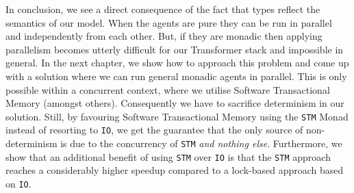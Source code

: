 In conclusion, we see a direct consequence of the fact that types reflect the semantics of our model. When the agents are pure they can be run in parallel and independently from each other. But, if they are monadic then applying parallelism becomes utterly difficult for our Transformer stack and impossible in general. In the next chapter, we show how to approach this problem and come up with a solution where we can run general monadic agents in parallel. This is only possible within a concurrent context, where we utilise Software Transactional Memory (amongst others). Consequently we have to sacrifice determinism in our solution. Still, by favouring Software Transactional Memory using the \texttt{STM} Monad instead of resorting to \texttt{IO}, we get the guarantee that the only source of non-determinism is due to the concurrency of \texttt{STM} \textit{and nothing else}. Furthermore, we show that an additional benefit of using \texttt{STM} over \texttt{IO} is that the \texttt{STM} approach reaches a considerably higher speedup compared to a lock-based approach based on \texttt{IO}. 